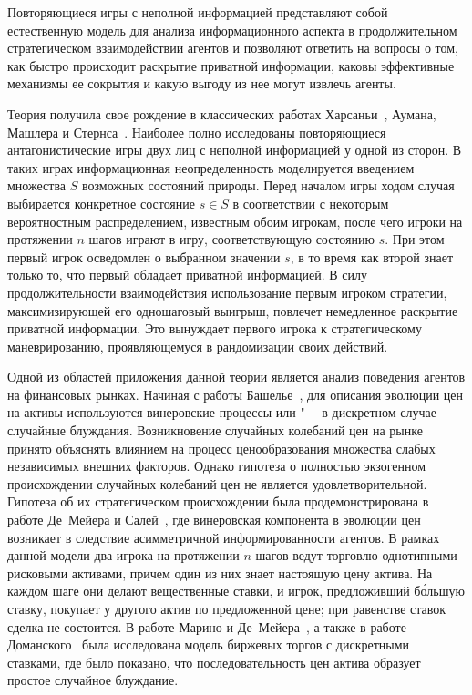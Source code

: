 {\actuality} Повторяющиеся игры с неполной информацией представляют собой
естественную модель для анализа информационного аспекта в продолжительном
стратегическом взаимодействии агентов и позволяют ответить на вопросы о том, как
быстро происходит раскрытие приватной информации, каковы эффективные механизмы
ее сокрытия и какую выгоду из нее могут извлечь агенты.

Теория получила свое рождение в классических работах Харсаньи~\cite{harsanyi67},
Аумана, Машлера и Стернса~\cite{aumann95}. Наиболее полно исследованы
повторяющиеся антагонистические игры двух лиц с неполной информацией у одной из
сторон. В таких играх информационная неопределенность моделируется введением
множества $S$ возможных состояний природы. Перед началом игры ходом случая
выбирается конкретное состояние $s \in S$ в соответствии с некоторым
вероятностным распределением, известным обоим игрокам, после чего игроки на
протяжении $n$ шагов играют в игру, соответствующую состоянию $s$. При этом
первый игрок осведомлен о выбранном значении $s$, в то время как второй знает
только то, что первый обладает приватной информацией. В силу продолжительности
взаимодействия использование первым игроком стратегии, максимизирующей его
одношаговый выигрыш, повлечет немедленное раскрытие приватной информации. Это
вынуждает первого игрока к стратегическому маневрированию, проявляющемуся в
рандомизации своих действий.

Одной из областей приложения данной теории является анализ поведения агентов на
финансовых рынках. Начиная с работы Башелье~\cite{bachelier1900}, для описания
эволюции цен на активы используются винеровские процессы или "--- в дискретном
случае --- случайные блуждания. Возникновение случайных колебаний цен на рынке
принято объяснять влиянием на процесс ценообразования множества слабых
независимых внешних факторов. Однако гипотеза о полностью экзогенном
происхождении случайных колебаний цен не является удовлетворительной. Гипотеза
об их стратегическом происхождении была продемонстрирована в работе Де~Мейера и
Салей~\cite{demeyer02}, где винеровская компонента в эволюции цен возникает в
следствие асимметричной информированности агентов. В рамках данной модели два
игрока на протяжении $n$ шагов ведут торговлю однотипными рисковыми активами,
причем один из них знает настоящую цену актива. На каждом шаге они делают
вещественные ставки, и игрок, предложивший б\'{о}льшую ставку, покупает у
другого актив по предложенной цене; при равенстве ставок сделка не состоится. В
работе Марино и Де~Мейера~\cite{demeyer05}, а также в работе
Доманского~\cite{domansky07} была исследована модель биржевых торгов с
дискретными ставками, где было показано, что последовательность цен актива
образует простое случайное блуждание.

